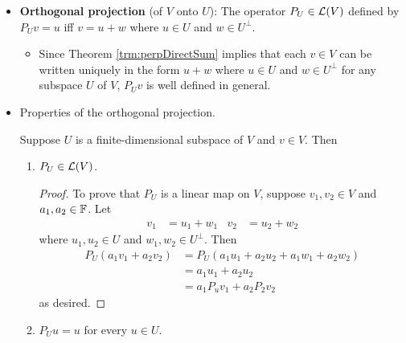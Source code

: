 \documentclass[../main.tex]{subfiles}
\begin{document}
\begin{itemize}
\begin{theorem}
\begin{proof}
            Now suppose that $v\in(U^\perp)^\perp$. By Theorem \ref{trm:perpDirectSum}, we have that $v=u+w$, where $u\in U$ and $w\in U^\perp$. It follows that $v-u=w\in U^\perp$ and, since $v\in(U^\perp)^\perp$ by hypothesis and $u\in(U^\perp)^\perp$ by the first part of the proof, that $v-u\in(U^\perp)^\perp$. Therefore, $v-u\in U^\perp\cap(U^\perp)^\perp\subset\{0\}$, so $v-u=0$ or $v=u\in U$, as desired.
        \end{proof}
    \end{theorem}
    \item \textbf{Orthogonal projection} (of $V$ onto $U$): The operator $P_U\in\mathcal{L}(V)$ defined by $P_Uv=u$ iff $v=u+w$ where $u\in U$ and $w\in U^\perp$.
    \begin{itemize}
        \item Since Theorem \ref{trm:perpDirectSum} implies that each $v\in V$ can be written uniquely in the form $u+w$ where $u\in U$ and $w\in U^\perp$ for any subspace $U$ of $V$, $P_Uv$ is well defined in general.
    \end{itemize}
    \item Properties of the orthogonal projection.
    \begin{theorem}\label{trm:projProperties}
        Suppose $U$ is a finite-dimensional subspace of $V$ and $v\in V$. Then
        \begin{enumerate}[label={\textup{(}\alph*\textup{)}},ref={\thetheorem\alph*}]
            \item \label{trm:projPropertiesa}$P_U\in\mathcal{L}(V)$.
            \begin{proof}
                To prove that $P_U$ is a linear map on $V$, suppose $v_1,v_2\in V$ and $a_1,a_2\in\mathbb{F}$. Let
                \begin{align*}
                    v_1 &= u_1+w_1&
                    v_2 &= u_2+w_2
                \end{align*}
                where $u_1,u_2\in U$ and $w_1,w_2\in U^\perp$. Then
                \begin{align*}
                    P_U(a_1v_1+a_2v_2) &= P_U(a_1u_1+a_2u_2+a_1w_1+a_2w_2)\\
                    &= a_1u_1+a_2u_2\\
                    &= a_1P_uv_1+a_2P_2v_2
                \end{align*}
                as desired.
            \end{proof}
            \item \label{trm:projPropertiesb}$P_Uu=u$ for every $u\in U$.

\end{enumerate}
\end{theorem}
\end{itemize}
\end{document}
